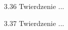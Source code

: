 \begin{enumerate}
    \item [3.36] Twierdzenie ...
    \item [3.37] Twierdzenie ...
\end{enumerate}

%